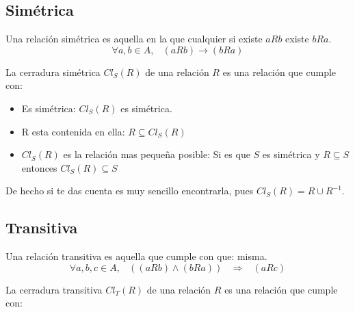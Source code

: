 \documentclass[12pt, fleqn]{report}                             %
\DeclareMathOperator \Space {\quad}                             %
\DeclareMathOperator \MiniSpace {\;}                            %
\newcommand \lequal {\MiniSpace \Leftrightarrow \MiniSpace}     %
\newcommand \linfire {\MiniSpace \Rightarrow \MiniSpace}        %
\begin{document}
            \clearpage
            \subsection{Simétrica}

                Una relación simétrica es aquella en la que cualquier si existe $aRb$ existe $bRa$.
                \begin{equation*}
                    \forall a,b \in A,\MiniSpace (aRb) \to (bRa)
                \end{equation*}


                La cerradura simétrica $Cl_S(R)$ de una relación $R$ es una relación que cumple con:

                \begin{itemize}
                    \item Es simétrica: $Cl_S(R)$ es simétrica. 
                    \item R esta contenida en ella: $R \subseteq Cl_S(R)$
                    \item $Cl_S(R)$ es la relación mas pequeña posible: 
                    Si es que $S$ es simétrica y $R \subseteq S$ entonces $Cl_S(R) \subseteq S$
                \end{itemize}

                De hecho si te das cuenta es muy sencillo encontrarla, pues
                $Cl_S(R) = R \cup R^{-1}$.



            \clearpage
            \subsection{Transitiva}

                Una relación transitiva es aquella que cumple con que:
                misma.
                \begin{equation*}
                    \forall a,b,c \in A, \MiniSpace ((aRb) \land (bRa)) \linfire (aRc)
                \end{equation*}

                La cerradura transitiva $Cl_T(R)$ de una relación $R$ es una relación que cumple con:
\end{document}
